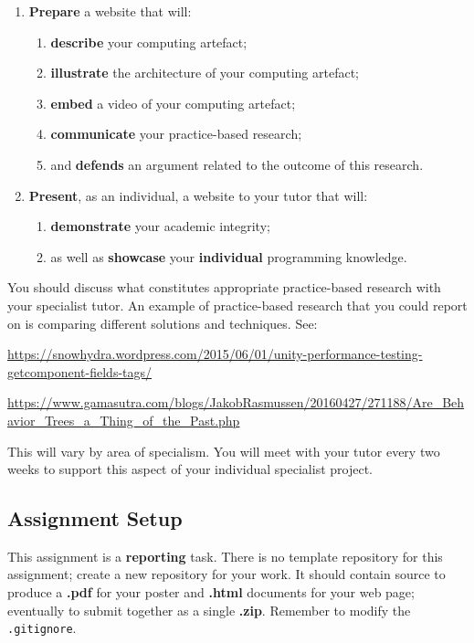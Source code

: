 \documentclass{../../fal_assignment}
\begin{document}
\begin{enumerate}[label=(\Alph*)]
\begin{enumerate}[label=(\roman*)]
		\end{enumerate}
	\item \textbf{Prepare} a website that will:
		\begin{enumerate}[label=(\roman*)]
			\item \textbf{describe} your computing artefact;
			\item \textbf{illustrate} the architecture of your computing artefact;
			\item \textbf{embed} a video of your computing artefact;
			\item \textbf{communicate} your practice-based research;
			\item and \textbf{defends} an argument related to the outcome of this research.
		\end{enumerate}		
	\item \textbf{Present}, as an individual, a website to your tutor that will:
		\begin{enumerate}[label=(\roman*)]
			\item \textbf{demonstrate} your academic integrity;
			\item as well as \textbf{showcase} your \textbf{individual} programming knowledge.
		\end{enumerate}			
\end{enumerate}

You should discuss what constitutes appropriate practice-based research with your specialist tutor. An example of practice-based research that you could report on is comparing different solutions and techniques. See:

\url{https://snowhydra.wordpress.com/2015/06/01/unity-performance-testing-getcomponent-fields-tags/} 

\url{https://www.gamasutra.com/blogs/JakobRasmussen/20160427/271188/Are_Behavior_Trees_a_Thing_of_the_Past.php} 

This will vary by area of specialism. You will meet with your tutor every two weeks to support this aspect of your individual specialist project.

\subsection*{Assignment Setup}

This assignment is a \textbf{reporting} task. There is no template repository for this assignment; create a new repository for your work. It should contain source to produce a \textbf{.pdf} for your poster and \textbf{.html} documents for your web page; eventually to submit together as a single \textbf{.zip}.
Remember to modify the \texttt{.gitignore}.
\end{document}
